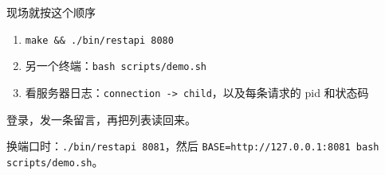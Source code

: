 \documentclass[aspectratio=169,11pt,professionalfonts]{ctexbeamer}
\begin{document}
\begin{frame}{现场就按这个顺序}
\begin{enumerate}
  \item \texttt{make \&\& ./bin/restapi 8080}
  \item 另一个终端：\texttt{bash scripts/demo.sh}
  \item 看服务器日志：\texttt{connection -> child}，以及每条请求的 pid 和状态码
\end{enumerate}
\vspace{0.7em}
\begin{center}
{\large 登录，发一条留言，再把列表读回来。}
\end{center}
\vspace{0.45em}
{\small 换端口时：\texttt{./bin/restapi 8081}，然后 \texttt{BASE=http://127.0.0.1:8081 bash scripts/demo.sh}。}
\end{frame}
\end{document}
